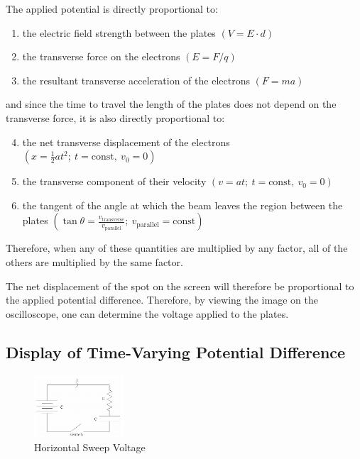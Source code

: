 The applied potential is directly proportional to:
\begin{enumerate}
    \item the electric field strength between the plates $\left( V = E\cdot d \right)$
    \item the transverse force on the electrons $\left( E = F /q \right)$
    \item the resultant transverse acceleration of the electrons $\left( F = ma \right)$
\end{enumerate}
and since the time to travel the length of the plates does not depend on the transverse force, it is also directly proportional to:
\begin{enumerate}
    \setcounter{enumi}{3}
    \item the net transverse displacement of the electrons $\displaystyle\left( x = \frac{1}{2}at^2;\ t=\text{const},\ v_0=0 \right)$
    \item the transverse component of their velocity $\left( v = at;\ t=\text{const},\ v_0 = 0 \right)$
    \item the tangent of the angle at which the beam leaves the region between the plates $\displaystyle \left( \tan\theta = \frac{v_\text{transverse}}{v_\text{parallel}};\ v_\text{parallel} = \text{const} \right)$
\end{enumerate}

Therefore, when any of these quantities are multiplied by any factor, all of the others are multiplied by the same factor. \myskip

The net displacement of the spot on the screen will therefore be proportional to the applied potential difference. Therefore, by viewing the image on the oscilloscope, one can determine the voltage applied to the plates.

\subsection{Display of Time-Varying Potential Difference}

\begin{figure}[h]
    \begin{center}
        \includegraphics[width=0.3\textwidth]{./Exp3/pic/image3.png}
    \end{center}
    \caption{Horizontal Sweep Voltage}
    \label{fig:horizvol}
\end{figure}

